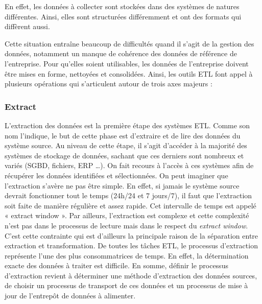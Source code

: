 \documentclass[12pt,a4wide,twoside]{report}
\begin{document}
En effet, les données à collecter sont stockées dans des systèmes de natures différentes. Ainsi, elles sont structurées différemment et ont des formats qui diffèrent aussi. \newline

Cette situation entraîne beaucoup de difficultés quand il s’agit de la gestion des données, notamment un manque de cohérence des données de référence de l’entreprise.
Pour qu’elles soient utilisables, les données de l’entreprise doivent être mises en forme, nettoyées et consolidées. Ainsi, les outils ETL font appel à plusieurs opérations qui s’articulent autour de trois axes majeurs :

\subsubsection{Extract}
L’extraction des données est la première étape des systèmes ETL. Comme son nom l’indique, le but de cette phase est d’extraire et de lire des données du système source.
Au niveau de cette étape, il s’agit d’accéder à la majorité des systèmes de stockage de données, sachant que ces derniers sont nombreux et variés (SGBD, fichiers, ERP …). On fait recours à l’accès à ces systèmes afin de récupérer les données identifiées et sélectionnées.
On peut imaginer que l’extraction s’avère ne pas être simple. En effet, si jamais le système source devrait fonctionner tout le temps (24h/24 et 7 jours/7), il faut que l’extraction soit faite de manière régulière et assez rapide. Cet intervalle de temps est appelé « extract window ». 
Par ailleurs, l’extraction est complexe et cette complexité n’est pas dans le processus de lecture mais dans le respect du \emph{extract window}. C’est cette contrainte qui est d’ailleurs la principale raison de la séparation entre extraction et transformation. \newline
De toutes les tâches ETL, le processus d’extraction représente l’une des plus consommatrices de temps. En effet, la détermination exacte des données à traiter est difficile. En somme, définir le processus d’extraction revient à déterminer une méthode d’extraction des données sources, de choisir un processus de transport de ces données et un processus de mise à jour de l’entrepôt de données à alimenter.
\end{document}
